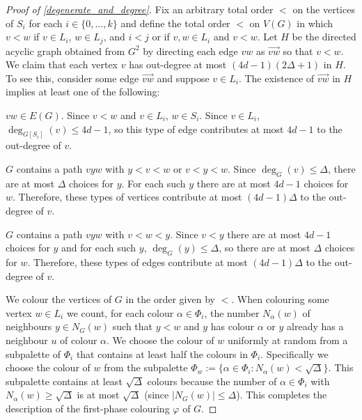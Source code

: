\documentclass{patmorin}
\begin{document}
\begin{proof}[Proof of \cref{degenerate_and_degree}]
  Fix an arbitrary total order $<$ on the vertices of $S_i$ for each $i\in\{0,\ldots,k\}$ and define the total order $<$ on $V(G)$ in which $v <w$ if $v\in L_i$, $w\in L_j$, and $i<j$ or if $v,w\in L_i$ and $v<w$.  Let $H$ be the directed acyclic graph obtained from $G^2$ by directing each edge $vw$ as $\overrightarrow{vw}$ so that $v<w$.  We claim that each vertex $v$ has out-degree at most $(4d-1)(2\Delta+1)$ in $H$.  To see this, consider some edge $\overrightarrow{vw}$ and suppose $v\in L_i$.  The existence of $\overrightarrow{vw}$ in $H$ implies at least one of the following:
  \begin{compactenum}
    \item $vw\in E(G)$.  Since $v<w$ and $v\in L_i$, $w\in S_i$.  Since $v\in L_i$, $\deg_{G[S_i]}(v)\le 4d-1$, so this type of edge contributes at most $4d-1$ to the out-degree of $v$.
    \item $G$ contains a path $vyw$ with $y < v < w$ or $v < y < w$.  Since $\deg_G(v)\le\Delta$, there are at most $\Delta$ choices for $y$.  For each such $y$ there are at most $4d-1$ choices for $w$.  Therefore, these types of vertices contribute at most $(4d-1)\Delta$ to the out-degree of $v$.
    \item $G$ contains a path $vyw$ with $v < w < y$.  Since $v<y$ there are at most $4d-1$ choices for $y$ and for each such $y$, $\deg_G(y)\le\Delta$, so there are at most $\Delta$ choices for $w$.  Therefore, these types of edges contribute at most $(4d-1)\Delta$ to the out-degree of $v$.
  \end{compactenum}
  We colour the vertices of $G$ in the order given by $<$.  When colouring some vertex $w\in L_i$ we count, for each colour $\alpha\in \Phi_i$, the number $N_\alpha(w)$ of neighbours $y\in N_G(w)$ such that $y < w$ and $y$ has colour $\alpha$ or $y$ already has a neighbour $u$ of colour $\alpha$.  We choose the colour of $w$ uniformly at random from a subpalette of $\Phi_i$ that contains at least half the colours in $\Phi_i$.  Specifically we choose the colour of $w$ from the subpalette $\Phi_w:=\{\alpha\in\Phi_i: N_{\alpha}(w)<\sqrt{\Delta}\}$.  This subpalette contains at least $\sqrt{\Delta}$ colours because the number of $\alpha\in\Phi_i$ with $N_\alpha(w)\ge \sqrt{\Delta}$ is at most $\sqrt{\Delta}$ (since $|N_G(w)|\leq \Delta$).
  This completes the description of the first-phase colouring $\varphi$ of $G$.


\end{proof}
\end{document}
